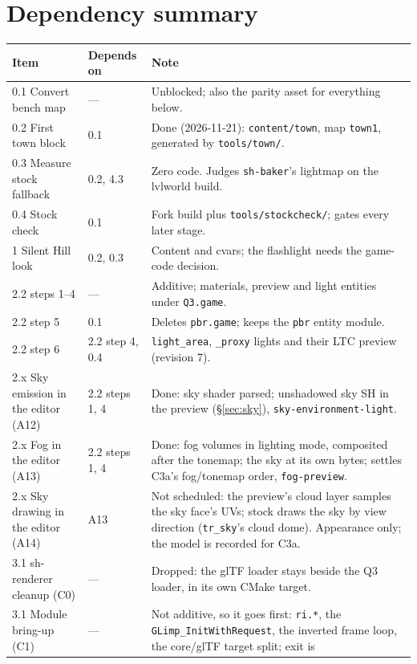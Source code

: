 \documentclass[11pt,a4paper]{article}
\begin{document}
\section{Dependency summary}

\begin{longtable}{@{}llp{}@{}}
\toprule
Item & Depends on & Note \\
\midrule
\endhead
0.1 Convert bench map & --- & Unblocked; also the parity asset for everything below. \\
0.2 First town block & 0.1 & Done (2026-11-21): \texttt{content/town}, map \texttt{town1}, generated by \texttt{tools/town/}. \\
0.3 Measure stock fallback & 0.2, 4.3 & Zero code. Judges \texttt{sh-baker}'s lightmap on the
  lvlworld build. \\
0.4 Stock check & 0.1 & Fork build plus \texttt{tools/stockcheck/}; gates every later stage. \\
1 Silent Hill look & 0.2, 0.3 & Content and cvars; the flashlight needs the game-code decision. \\
2.2 steps 1--4 & --- & Additive; materials, preview and light entities under \texttt{Q3.game}. \\
2.2 step 5 & 0.1 & Deletes \texttt{pbr.game}; keeps the \texttt{pbr} entity module. \\
2.2 step 6 & 2.2 step 4, 0.4 & \texttt{light\_area}, \texttt{\_proxy} lights and their LTC preview
  (revision 7). \\
2.x Sky emission in the editor (A12) & 2.2 steps 1, 4 & Done: sky shader parsed; unshadowed sky SH in
  the preview (§\ref{sec:sky}), \texttt{sky-environment-light}. \\
2.x Fog in the editor (A13) & 2.2 steps 1, 4 & Done: fog volumes in lighting mode, composited after
  the tonemap; the sky at its own bytes; settles C3a's fog/tonemap order, \texttt{fog-preview}. \\
2.x Sky drawing in the editor (A14) & A13 & Not scheduled: the preview's cloud layer samples the sky
  face's UVs; stock draws the sky by view direction (\texttt{tr\_sky}'s cloud dome). Appearance
  only; the model is recorded for C3a. \\
3.1 sh-renderer cleanup (C0) & --- & Dropped: the glTF loader stays beside the Q3 loader, in its
  own CMake target. \\
3.1 Module bring-up (C1) & --- & Not additive, so it goes first: \texttt{ri.*}, the
  \texttt{GLimp\_InitWithRequest}, the inverted frame loop, the core/glTF target split; exit is

\end{longtable}
\end{document}
